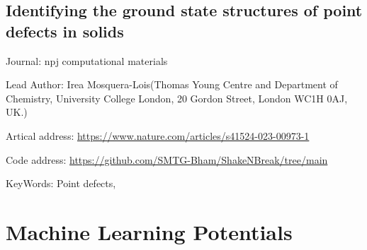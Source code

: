 \documentclass[11pt]{elegantbook}
\begin{document}
\subsection{Identifying the ground state structures of point defects in solids}
\begin{brief}
    \item Journal: npj computational materials
    \item Lead Author: Irea Mosquera-Lois(Thomas Young Centre and Department of Chemistry, University College London, 20 Gordon Street, London WC1H 0AJ, UK.)
    \item Artical address: \href{https://www.nature.com/articles/s41524-023-00973-1}{https://www.nature.com/articles/s41524-023-00973-1}
    \item Code address: \href{https://github.com/SMTG-Bham/ShakeNBreak/tree/main}{https://github.com/SMTG-Bham/ShakeNBreak/tree/main}
    \item KeyWords: Point defects, 
\end{brief}





\section{Machine Learning Potentials}
\end{document}
